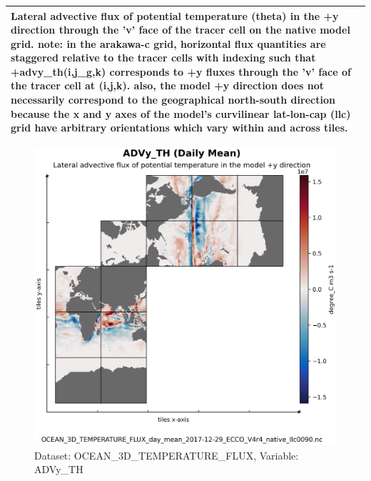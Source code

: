 \begin{longtable}{|m{}|m{}|m{}|m{}|}
\multicolumn{4}{|p{1\textwidth}|}{Lateral advective flux of potential temperature (theta) in the +y direction through the 'v' face of the tracer cell on the native model grid. note: in the arakawa-c grid, horizontal flux quantities are staggered relative to the tracer cells with indexing such that +advy\_th(i,j\_g,k) corresponds to +y fluxes through the 'v' face of the tracer cell at (i,j,k). also, the model +y direction does not necessarily correspond to the geographical north-south direction because the x and y axes of the model's curvilinear lat-lon-cap (llc) grid have arbitrary orientations which vary within and across tiles.} \\ \hline
\end{longtable}

\begin{figure}[H]
\centering
\includegraphics[scale=0.55]{../images/plots/native_plots/Ocean_Three-Dimensional_Potential_Temperature_Fluxes/ADVy_TH.png}
\caption{Dataset: OCEAN\_3D\_TEMPERATURE\_FLUX, Variable: ADVy\_TH}
\label{tab:table-OCEAN_3D_TEMPERATURE_FLUX_ADVy_TH-Plot}
\end{figure}
\pagebreak
